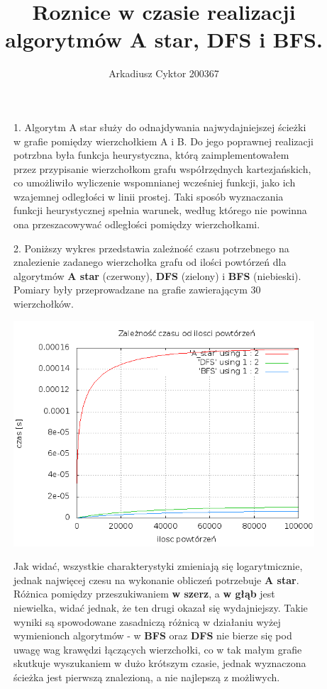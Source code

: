 \documentclass[a4paper,11pt]{report}
\title{Roznice w czasie realizacji algorytmów A star, DFS i BFS.}
\author{Arkadiusz Cyktor 200367}
\begin{document}
\maketitle

\begin{figure}
	1. Algorytm A star służy do odnajdywania najwydajniejszej ścieżki w grafie pomiędzy wierzchołkiem A i B. Do jego poprawnej realizacji potrzbna była funkcja heurystyczna, którą zaimplementowałem przez przypisanie wierzchołkom grafu współrzędnych kartezjańskich, co umożliwiło wyliczenie wspomnianej wcześniej funkcji, jako ich wzajemnej odległości w linii prostej. Taki sposób wyznaczania funkcji heurystycznej spełnia warunek, według którego nie powinna ona przeszacowywać odległości pomiędzy wierzchołkami. 
\end{figure}

\begin{figure}
  2. Poniższy wykres przedstawia zależność czasu potrzebnego na znalezienie zadanego wierzchołka grafu od ilości powtórzeń dla algorytmów \textbf{A star} (czerwony), \textbf{DFS} (zielony) i \textbf{BFS} (niebieski). Pomiary były przeprowadzane na grafie zawierającym 30 wierzchołków.
  \\\begin{center} \includegraphics[scale=0.55]{./Razem.png}\end{center}
  Jak widać, wszystkie charakterystyki zmieniają się logarytmicznie, jednak najwięcej czesu na wykonanie obliczeń potrzebuje \textbf{A star}. Różnica pomiędzy przeszukiwaniem \textbf{w szerz}, a \textbf{w głąb} jest niewielka, widać jednak, że ten drugi okazał się wydajniejszy. Takie wyniki są spowodowane zasadniczą różnicą w działaniu wyżej wymienionch algorytmów - w \textbf{BFS} oraz \textbf{DFS} nie bierze się pod uwagę wag krawędzi łączących wierzchołki, co w tak małym grafie skutkuje wyszukaniem w dużo krótszym czasie, jednak wyznaczona ścieżka jest pierwszą znalezioną, a nie najlepszą z możliwych.
\end{figure}
\end{document}
